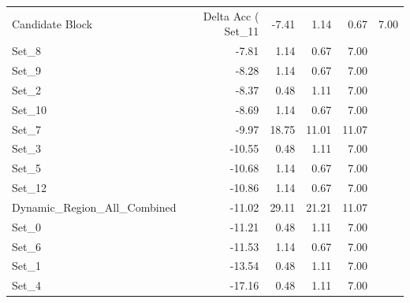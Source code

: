\begin{tabular}{lrrrr}
\toprule
Candidate Block & Delta Acc (%
\midrule
Set_11 & -7.41 & 1.14 & 0.67 & 7.00 \\
Set_8 & -7.81 & 1.14 & 0.67 & 7.00 \\
Set_9 & -8.28 & 1.14 & 0.67 & 7.00 \\
Set_2 & -8.37 & 0.48 & 1.11 & 7.00 \\
Set_10 & -8.69 & 1.14 & 0.67 & 7.00 \\
Set_7 & -9.97 & 18.75 & 11.01 & 11.07 \\
Set_3 & -10.55 & 0.48 & 1.11 & 7.00 \\
Set_5 & -10.68 & 1.14 & 0.67 & 7.00 \\
Set_12 & -10.86 & 1.14 & 0.67 & 7.00 \\
Dynamic_Region_All_Combined & -11.02 & 29.11 & 21.21 & 11.07 \\
Set_0 & -11.21 & 0.48 & 1.11 & 7.00 \\
Set_6 & -11.53 & 1.14 & 0.67 & 7.00 \\
Set_1 & -13.54 & 0.48 & 1.11 & 7.00 \\
Set_4 & -17.16 & 0.48 & 1.11 & 7.00 \\
\bottomrule
\end{tabular}
